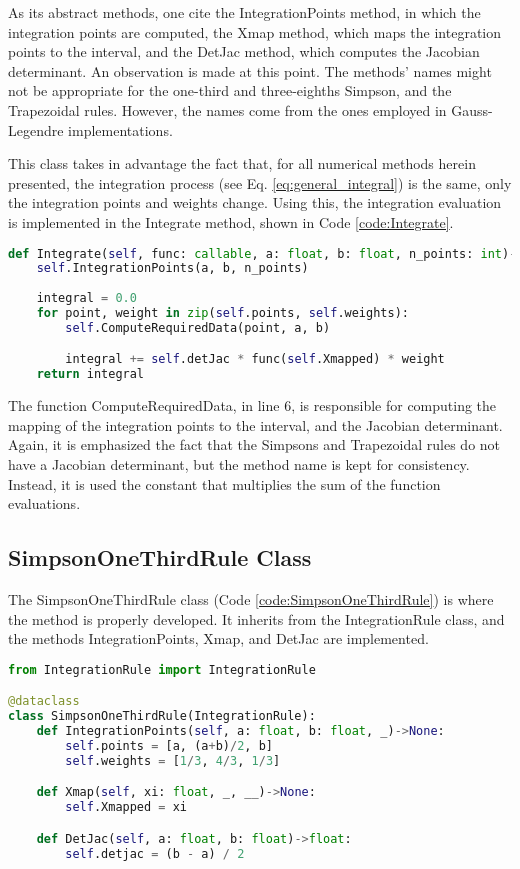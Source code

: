 As its abstract methods, one cite the IntegrationPoints method, in which the integration points are computed, the Xmap method, which maps the integration points to the interval, and the DetJac method, which computes the Jacobian determinant. An observation is made at this point. The methods' names might not be appropriate for the one-third and three-eighths Simpson, and the Trapezoidal rules. However, the names come from the ones employed in Gauss-Legendre implementations. 

This class takes in advantage the fact that, for all numerical methods herein presented, the integration process (see Eq. \eqref{eq:general_integral}) is the same, only the integration points and weights change. Using this, the integration evaluation is implemented in the Integrate method, shown in Code \ref{code:Integrate}.
\begin{lstlisting}[language=python, caption={Integrate Method.}, label={code:Integrate}]
def Integrate(self, func: callable, a: float, b: float, n_points: int)->float:
    self.IntegrationPoints(a, b, n_points)
    
    integral = 0.0
    for point, weight in zip(self.points, self.weights):
        self.ComputeRequiredData(point, a, b)

        integral += self.detJac * func(self.Xmapped) * weight 
    return integral
\end{lstlisting}

The function ComputeRequiredData, in line 6, is responsible for computing the mapping of the integration points to the interval, and the Jacobian determinant. Again, it is emphasized the fact that the Simpsons and Trapezoidal rules do not have a Jacobian determinant, but the method name is kept for consistency. Instead, it is used the constant that multiplies the sum of the function evaluations. 

\subsection{SimpsonOneThirdRule Class}
The SimpsonOneThirdRule class (Code \ref{code:SimpsonOneThirdRule}) is where the method is properly developed. It inherits from the IntegrationRule class, and the methods IntegrationPoints, Xmap, and DetJac are implemented.
\begin{lstlisting}[language=python, caption={SimpsonOneThirdRule Class.}, label={code:SimpsonOneThirdRule}]
from IntegrationRule import IntegrationRule

@dataclass 
class SimpsonOneThirdRule(IntegrationRule):
    def IntegrationPoints(self, a: float, b: float, _)->None:
        self.points = [a, (a+b)/2, b]
        self.weights = [1/3, 4/3, 1/3]

    def Xmap(self, xi: float, _, __)->None:
        self.Xmapped = xi

    def DetJac(self, a: float, b: float)->float:
        self.detjac = (b - a) / 2
\end{lstlisting}

